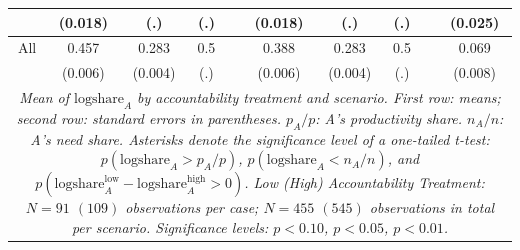 \documentclass[smallcondensed]{svjour3}
\begin{document}
\begin{table}
{\begin{tabularx}{13.5cm}{cccccccccc}
          & (0.018)               & (.)            &  (.)              &   & (0.018)               &  (.)            & (.)             &   & (0.025)           \\\hline
   All    &  0.457                & 0.283\sym{***} &  0.5\sym{***}     &   &  0.388                &  0.283\sym{***} & 0.5\sym{***}    &   &  0.069\sym{***}   \\
          & (0.006)               & (0.004)        &  (.)              &   & (0.006)               & (0.004)         & (.)             &   & (0.008)           \\\hline
\multicolumn{10}{p{13cm}}{\footnotesize\textit{Mean of $\mbox{logshare}_A$ by accountability treatment and scenario. First row: means; second row: standard errors in parentheses.  $p_A/p$: A's productivity share. $n_A/n$: A's need share. Asterisks denote the significance level of a one-tailed t-test: $p(\mbox{logshare}_A>p_A/p)$, $p(\mbox{logshare}_A<n_A/n)$, and $p(\mbox{logshare}_A^{\mbox{low}}-\mbox{logshare}_A^{\mbox{high}}>0)$. Low (High) Accountability Treatment: $N=91$ $(109)$ observations per case; $N=455$ $(545)$ observations in total per scenario. Significance levels: \sym{*} \(p<0.10\), \sym{**} \(p<0.05\), \sym{***} \(p<0.01\).}}
\end{tabularx}
}
\end{table}
%
\clearpage
%
\end{document}
